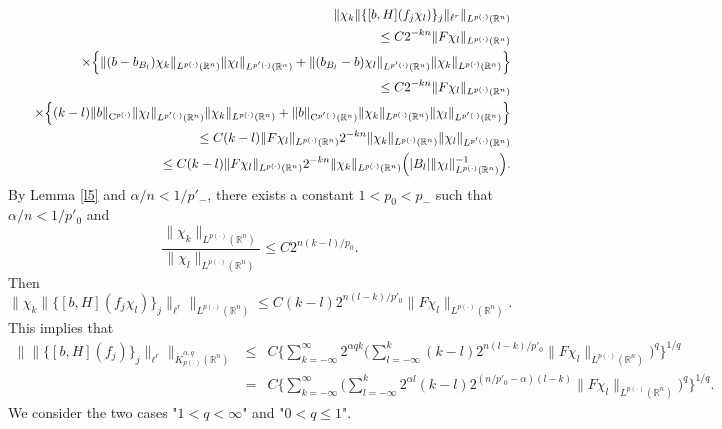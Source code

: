 \documentclass{amse-new}
\numberwithin{equation}{section} %
\begin{document}
\begin{eqnarray*}
&&\|\chi_{k}\|\{[b,H](f_{j}\chi_{l})\}_{j}\|_{\ell^{r}}\|_{L^{p(\cdot)}(\mathbb{R}^n)}\\
&&\leq C2^{-kn}\|F\chi_{l}\|_{L^{p(\cdot)}(\mathbb{R}^n)}\\
&&\quad\times\Big\{\|(b-b_{B_{l}})\chi_{k}\|_{{L}^{p(\cdot)}(\mathbb{R}^n)}\|\chi_{l}\|_{L^{p'(\cdot)}(\mathbb{R}^n)}
+\|(b_{B_{l}}-b)\chi_{l}\|_{L^{p'(\cdot)}(\mathbb{R}^n)}\|\chi_{k}\|_{L^{p(\cdot)}(\mathbb{R}^n)}\Big\}\\
&&\leq C2^{-kn}\|F\chi_{l}\|_{L^{p(\cdot)}(\mathbb{R}^n)}\\
&&\quad \times\Big\{(k-l)\|b\|_{{\rm C}^{p(\cdot)}}\|\chi_{l}\|_{L^{p'(\cdot)}(\mathbb{R}^n)}\|\chi_{k}\|_{L^{p(\cdot)}(\mathbb{R}^n)}
+\|b\|_{{\rm C}^{p'(\cdot)}(\mathbb{R}^n)}\|\chi_{k}\|_{L^{p(\cdot)}(\mathbb{R}^n)}\|\chi_{l}\|_{L^{p'(\cdot)}(\mathbb{R}^{n})}\Big\}\\
&&\leq C(k-l)\|F\chi_{l}\|_{L^{p(\cdot)}(\mathbb{R}^n)}2^{-kn} \|\chi_{k}\|_{L^{p(\cdot)}(\mathbb{R}^n)}\|\chi_{l}\|_{L^{p'(\cdot)}(\mathbb{R}^{n})}\\
&&\leq C(k-l)\|F\chi_{l}\|_{L^{p(\cdot)}(\mathbb{R}^n)}2^{-kn} \|\chi_{k}\|_{L^{p(\cdot)}(\mathbb{R}^n)}\Big(|B_{l}|\|\chi_{l}\|^{-1}_{L^{p(\cdot)}(\mathbb{R}^n)}\Big).
\end{eqnarray*}
By Lemma \ref{l5} and $\alpha/n<1/p'_{-}$, there exists a constant $1<p_{0}<p_{-}$ such that $\alpha/n<1/p'_{0}$ and
$$\frac{\|\chi_{k}\|_{L^{p(\cdot)}(\mathbb{R}^n)}}{\|\chi_{l}\|_{L^{p(\cdot)}(\mathbb{R}^n)}}\leq C2^{n(k-l)/p_{0}}.$$
Then
$$\|\chi_{k}\|\{[b,H](f_{j}\chi_{l})\}_{j}\|_{\ell^{r}}\|_{L^{p(\cdot)}(\mathbb{R}^n)}\leq C(k-l)2^{n(l-k)/p'_{0}}\|F\chi_{l}\|_{L^{p(\cdot)}(\mathbb{R}^n)}.$$
This implies that
\begin{eqnarray*}
\|\|\{[b,H](f_{j})\}_{j}\|_{\ell^{r}}\|_{\dot{K}^{\alpha,q}_{p(\cdot)}(\mathbb{R}^n)}
&\leq& C\bigg\{\sum_{k=-\infty}^{\infty}2^{\alpha qk}\bigg(\sum_{l=-\infty}^{k}(k-l)2^{n(l-k)/p'_{0}}\|F\chi_{l}\|_{L^{p(\cdot)}(\mathbb{R}^n)}\bigg)^{q}\bigg\}^{1/q}\\
&=& C\bigg\{\sum_{k=-\infty}^{\infty}\bigg(\sum_{l=-\infty}^{k}2^{\alpha l}(k-l)2^{(n/p'_{0}-\alpha)(l-k)}\|F\chi_{l}\|_{L^{p(\cdot)}(\mathbb{R}^n)}\bigg)^{q}\bigg\}^{1/q}.
\end{eqnarray*}
We consider the two cases "$1<q<\infty$" and "$0<q\leq 1$".
\end{document}
